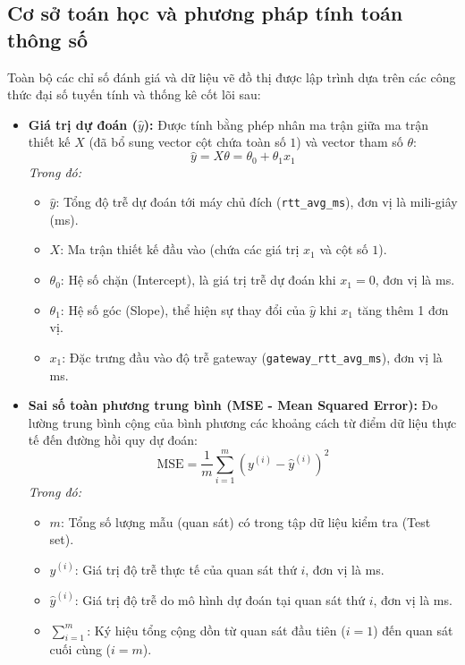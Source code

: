 \subsection{Cơ sở toán học và phương pháp tính toán thông số}
Toàn bộ các chỉ số đánh giá và dữ liệu vẽ đồ thị được lập trình dựa trên các công thức đại số tuyến tính và thống kê cốt lõi sau:
\begin{itemize}
    \item \textbf{Giá trị dự đoán ($\hat{y}$):} Được tính bằng phép nhân ma trận giữa ma trận thiết kế $X$ (đã bổ sung vector cột chứa toàn số $1$) và vector tham số $\theta$:
    \begin{equation}
        \hat{y} = X\theta = \theta_0 + \theta_1 x_1
    \end{equation}
    \textit{Trong đó:}
    \begin{itemize}
        \item $\hat{y}$: Tổng độ trễ dự đoán tới máy chủ đích (\texttt{rtt\_avg\_ms}), đơn vị là mili-giây (ms).
        \item $X$: Ma trận thiết kế đầu vào (chứa các giá trị $x_1$ và cột số $1$).
        \item $\theta_0$: Hệ số chặn (Intercept), là giá trị trễ dự đoán khi $x_1 = 0$, đơn vị là ms.
        \item $\theta_1$: Hệ số góc (Slope), thể hiện sự thay đổi của $\hat{y}$ khi $x_1$ tăng thêm 1 đơn vị.
        \item $x_1$: Đặc trưng đầu vào độ trễ gateway (\texttt{gateway\_rtt\_avg\_ms}), đơn vị là ms.
    \end{itemize}

    \item \textbf{Sai số toàn phương trung bình (MSE - Mean Squared Error):} Đo lường trung bình cộng của bình phương các khoảng cách từ điểm dữ liệu thực tế đến đường hồi quy dự đoán:
    \begin{equation}
        \text{MSE} = \frac{1}{m} \sum_{i=1}^{m} \left(y^{(i)} - \hat{y}^{(i)}\right)^2
    \end{equation}
    \textit{Trong đó:}
    \begin{itemize}
        \item $m$: Tổng số lượng mẫu (quan sát) có trong tập dữ liệu kiểm tra (Test set).
        \item $y^{(i)}$: Giá trị độ trễ thực tế của quan sát thứ $i$, đơn vị là ms.
        \item $\hat{y}^{(i)}$: Giá trị độ trễ do mô hình dự đoán tại quan sát thứ $i$, đơn vị là ms.
        \item $\sum_{i=1}^{m}$: Ký hiệu tổng cộng dồn từ quan sát đầu tiên ($i=1$) đến quan sát cuối cùng ($i=m$).
    \end{itemize}


\end{itemize}
